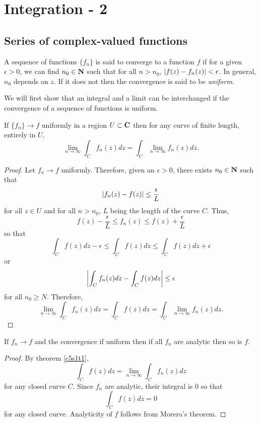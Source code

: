 \chapter{Integration - 2}\label{c5}
\section{Series of complex-valued functions}\label{c5s1}
A sequence of functions $\{f_n\}$ is said to converge to a function $f$ if for
a given $\epsilon > 0$, we can find $n_0 \in \mathbf{N}$ such that for all $n > n_0$,
$\left\vert{f(z) - f_n(z)}\right\vert < \epsilon$. In general, $n_0$ depends on $z$. If it does 
not then the convergence is said to be \emph{uniform}.

We will first show that an integral and a limit can be interchanged if the 
convergence of a sequence of functions is uniform.
\begin{thm}\label{c5s1t1}
If $\{f_n\} \rightarrow f$ uniformly in a region $U \subset \mathbf{C}$ then for
any curve of finite length, entirely in $U$,
\[
\lim_{n \rightarrow \infty}\int_C f_n(z) dz = \int_C \lim_{n \rightarrow \infty}
f_n(z)dz.
\]
\end{thm}
\begin{proof}
Let $f_n \rightarrow f$ uniformly. Therefore, given an $\epsilon > 0$,
there exists $n_0 \in \mathbf{N}$ such that
\[
\left\vert{f_n(z) - f(z)}\right\vert \le \frac{\epsilon}{L}
\]
for all $z \in U$ and for all $n > n_0$, $L$ being the length of the curve $C$. 
Thus,
\[
f(z) - \frac{\epsilon}{L} \le f_n(z) \le f(z) + \frac{\epsilon}{L}
\]
so that
\[
\int_C f(z)dz - \epsilon \le \int_C f(z)dz \le \int_C f(z)dz + \epsilon
\]
or
\[
\left\vert{\int_C f_n(z)dz - \int_C f(z)dz}\right\vert \le \epsilon
\]
for all $n_0 \ge N$. Therefore,
\[
\lim_{n \rightarrow \infty}\int_C f_n(z)dz = \int_C f(z)dz = 
\int_C \lim_{n \rightarrow \infty} f_n(z)dz.
\]
\end{proof}

\begin{cor}\label{c5s1c1}
If $f_n \rightarrow f$ and the convergence if uniform then if all $f_n$ are
analytic then so is $f$.
\end{cor}
\begin{proof}
By theorem \ref{c5s1t1},
\[
\int_C f(z)dz = \lim_{n \rightarrow \infty} \int_C f_n(z)dz
\]
for any closed curve $C$. Since $f_n$ are analytic, their integral is $0$ so
that
\[
\int_C f(z) dz = 0
\]
for any closed curve. Analyticity of $f$ follows from Morera's theorem.
\end{proof}

